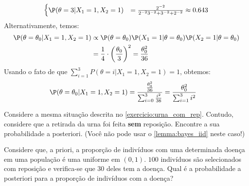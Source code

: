 {\begin{align*}
\begin{cases}
   \P(\theta=3|X_{1}=1, X_{2}=1)
   &= \frac{2^{-2}}{2^{-2}3^{-2} + 3^{-2} + 2^{-2}}
   \approx 0.643
  \end{cases}
 \end{align*}
 Alternativamente, temos:
 \begin{align*}
  \P(\theta=\theta_{0}|X_{1}=1, X_{2}=1)
  &\propto \P(\theta=\theta_{0})
  \P(X_{1}=1|\theta=\theta_{0})
  \P(X_{2}=1|\theta=\theta_{0}) \\
  &= \frac{1}{4} \cdot 
  \left(\frac{\theta_{0}}{3}\right)^{2}
  = \frac{\theta_{0}^{2}}{36}
 \end{align*}
 Usando o fato de que 
 $\sum_{i=1}^{3}{P(\theta=i|X_{1}=1, X_{2}=1)} = 1$,
 obtemos:
 \begin{align*}
  \P(\theta=\theta_{0}|X_{1}=1, X_{2}=1)
  &= \frac{\frac{\theta_{0}^{2}}{36}}{\sum_{i=0}^{3}
  {\frac{i^{2}}{36}}} 
  =\frac{\theta_{0}^{2}}
  {\sum_{i=1}^{3}{i^{2}}}
 \end{align*}
}{}

\begin{exercise}
 \label{exercicio:urna_sem_rep}
 Considere a mesma situação descrita no
 \cref{exercicio:urna_com_rep}.
 Contudo, considere que a retirada da urna foi 
 feita \textbf{sem} reposição.
 Encontre a sua probabilidade a posteriori. 
 (Você não pode usar o \cref{lemma:bayes_iid}
 neste caso!)
\end{exercise}


\begin{exercise}
 Considere que, a priori, a proporção de
 indivíduos com uma determinada doença em
 uma população é uma uniforme em $(0,1)$.
 $100$ indivíduos são selecionados com reposição e
 verifica-se que $30$ deles tem a doença.
 Qual é a probabilidade a posteriori para 
 a proporção de indivíduos com a doença?
\end{exercise}

